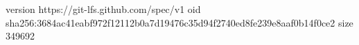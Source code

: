 version https://git-lfs.github.com/spec/v1
oid sha256:3684ac41eabf972f12112b0a7d19476c35d94f2740ed8fe239e8aaf0b14f0ce2
size 349692
